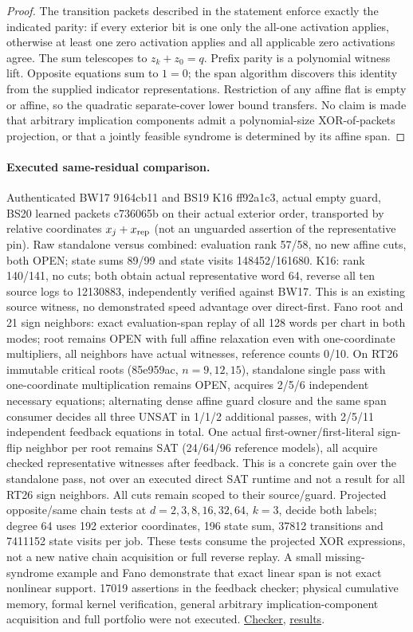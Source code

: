 \documentclass[11pt]{article}
\begin{document}
\begin{proof}
The transition packets described in the statement enforce exactly the indicated parity: if every exterior bit is one only the all-one activation applies, otherwise at least one zero activation applies and all applicable zero activations agree. The sum telescopes to $z_k+z_0=q$. Prefix parity is a polynomial witness lift. Opposite equations sum to $1=0$; the span algorithm discovers this identity from the supplied indicator representations. Restriction of any affine flat is empty or affine, so the quadratic separate-cover lower bound transfers. No claim is made that arbitrary implication components admit a polynomial-size XOR-of-packets projection, or that a jointly feasible syndrome is determined by its affine span.
\end{proof}
\paragraph{Executed same-residual comparison.}
Authenticated BW17 9164cb11 and BS19 K16 ff92a1c3, actual empty guard, BS20 learned packets c736065b on their actual exterior order, transported by relative coordinates $x_j+x_{\rm rep}$ (not an unguarded assertion of the representative pin). Raw standalone versus combined: evaluation rank 57/58, no new affine cuts, both OPEN; state sums 89/99 and state visits 148452/161680. K16: rank 140/141, no cuts; both obtain actual representative word 64, reverse all ten source logs to 12130883, independently verified against BW17. This is an existing source witness, no demonstrated speed advantage over direct-first. Fano root and 21 sign neighbors: exact evaluation-span replay of all 128 words per chart in both modes; root remains OPEN with full affine relaxation even with one-coordinate multipliers, all neighbors have actual witnesses, reference counts 0/10. On RT26 immutable critical roots (85e959ac, $n=9,12,15$), standalone single pass with one-coordinate multiplication remains OPEN, acquires 2/5/6 independent necessary equations; alternating dense affine guard closure and the same span consumer decides all three UNSAT in 1/1/2 additional passes, with 2/5/11 independent feedback equations in total. One actual first-owner/first-literal sign-flip neighbor per root remains SAT (24/64/96 reference models), all acquire checked representative witnesses after feedback. This is a concrete gain over the standalone pass, not over an executed direct SAT runtime and not a result for all RT26 sign neighbors. All cuts remain scoped to their source/guard. Projected opposite/same chain tests at $d=2,3,8,16,32,64$, $k=3$, decide both labels; degree 64 uses 192 exterior coordinates, 196 state sum, 37812 transitions and 7411152 state visits per job. These tests consume the projected XOR expressions, not a new native chain acquisition or full reverse replay. A small missing-syndrome example and Fano demonstrate that exact linear span is not exact nonlinear support. 17019 assertions in the feedback checker; physical cumulative memory, formal kernel verification, general arbitrary implication-component acquisition and full portfolio were not executed. \href{https://github.com/j15marti/pnp/commit/bf6cf0035f4f7121bc8214b1582fc722d55993cc}{Checker}, \href{https://github.com/j15marti/pnp/commit/6d9917749c8438435d889b31e5c81ed0fc410e9a}{results}.
\end{document}
